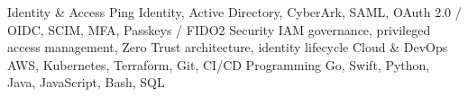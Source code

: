 \begin{cvskills}
  \cvskill
    {Identity \& Access}
    {Ping Identity, Active Directory, CyberArk, SAML, OAuth 2.0 / OIDC, SCIM, MFA, Passkeys / FIDO2}
  \cvskill
    {Security}
    {IAM governance, privileged access management, Zero Trust architecture, identity lifecycle}
  \cvskill
    {Cloud \& DevOps}
    {AWS, Kubernetes, Terraform, Git, CI/CD}
  \cvskill
    {Programming}
    {Go, Swift, Python, Java, JavaScript, Bash, SQL}
\end{cvskills}
